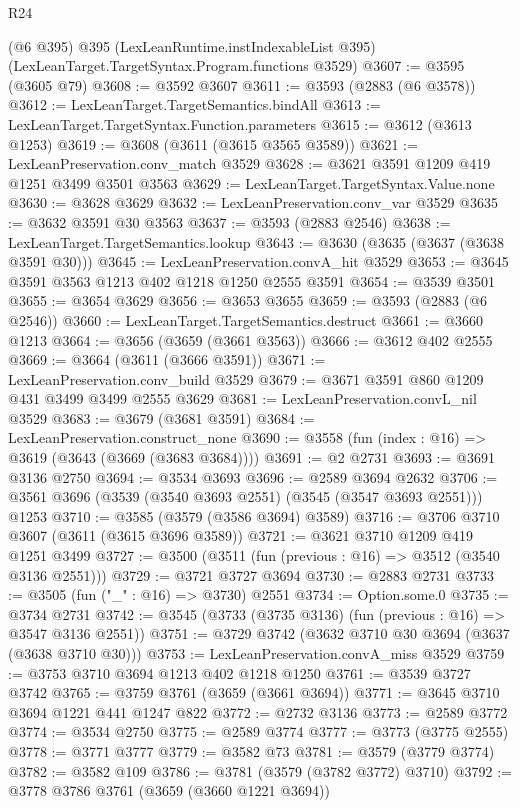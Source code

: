 \begin{lexlean}{R24}
\begin{coremodule}
    (@6 @395)
    @395
    (LexLeanRuntime.instIndexableList @395)
    (LexLeanTarget.TargetSyntax.Program.functions @3529)
@3607 := @3595 (@3605 @79)
@3608 := @3592 @3607
@3611 := @3593 (@2883 (@6 @3578))
@3612 := LexLeanTarget.TargetSemantics.bindAll
@3613 := LexLeanTarget.TargetSyntax.Function.parameters
@3615 := @3612 (@3613 @1253)
@3619 := @3608 (@3611 (@3615 @3565 @3589))
@3621 := LexLeanPreservation.conv_match @3529
@3628 := @3621 @3591 @1209 @419 @1251 @3499 @3501 @3563
@3629 := LexLeanTarget.TargetSyntax.Value.none
@3630 := @3628 @3629
@3632 := LexLeanPreservation.conv_var @3529
@3635 := @3632 @3591 @30 @3563
@3637 := @3593 (@2883 @2546)
@3638 := LexLeanTarget.TargetSemantics.lookup
@3643 := @3630 (@3635 (@3637 (@3638 @3591 @30)))
@3645 := LexLeanPreservation.convA_hit @3529
@3653 := @3645 @3591 @3563 @1213 @402 @1218 @1250 @2555 @3591
@3654 := @3539 @3501
@3655 := @3654 @3629
@3656 := @3653 @3655
@3659 := @3593 (@2883 (@6 @2546))
@3660 := LexLeanTarget.TargetSemantics.destruct
@3661 := @3660 @1213
@3664 := @3656 (@3659 (@3661 @3563))
@3666 := @3612 @402 @2555
@3669 := @3664 (@3611 (@3666 @3591))
@3671 := LexLeanPreservation.conv_build @3529
@3679 := @3671 @3591 @860 @1209 @431 @3499 @3499 @2555 @3629
@3681 := LexLeanPreservation.convL_nil @3529
@3683 := @3679 (@3681 @3591)
@3684 := LexLeanPreservation.construct_none
@3690 := @3558 (fun (index : @16) => @3619 (@3643 (@3669 (@3683 @3684))))
@3691 := @2 @2731
@3693 := @3691 @3136 @2750
@3694 := @3534 @3693
@3696 := @2589 @3694 @2632
@3706 := @3561 @3696 (@3539 (@3540 @3693 @2551) (@3545 (@3547 @3693 @2551))) @1253
@3710 := @3585 (@3579 (@3586 @3694) @3589)
@3716 := @3706 @3710 @3607 (@3611 (@3615 @3696 @3589))
@3721 := @3621 @3710 @1209 @419 @1251 @3499
@3727 := @3500 (@3511 (fun (previous : @16) => @3512 (@3540 @3136 @2551)))
@3729 := @3721 @3727 @3694
@3730 := @2883 @2731
@3733 := @3505 (fun ("_" : @16) => @3730) @2551
@3734 := Option.some.{0}
@3735 := @3734 @2731
@3742 := @3545 (@3733 (@3735 @3136) (fun (previous : @16) => @3547 @3136 @2551))
@3751 := @3729 @3742 (@3632 @3710 @30 @3694 (@3637 (@3638 @3710 @30)))
@3753 := LexLeanPreservation.convA_miss @3529
@3759 := @3753 @3710 @3694 @1213 @402 @1218 @1250
@3761 := @3539 @3727 @3742
@3765 := @3759 @3761 (@3659 (@3661 @3694))
@3771 := @3645 @3710 @3694 @1221 @441 @1247 @822
@3772 := @2732 @3136
@3773 := @2589 @3772
@3774 := @3534 @2750
@3775 := @2589 @3774
@3777 := @3773 (@3775 @2555)
@3778 := @3771 @3777
@3779 := @3582 @73
@3781 := @3579 (@3779 @3774)
@3782 := @3582 @109
@3786 := @3781 (@3579 (@3782 @3772) @3710)
@3792 := @3778 @3786 @3761 (@3659 (@3660 @1221 @3694))

\end{coremodule}
\end{lexlean}
